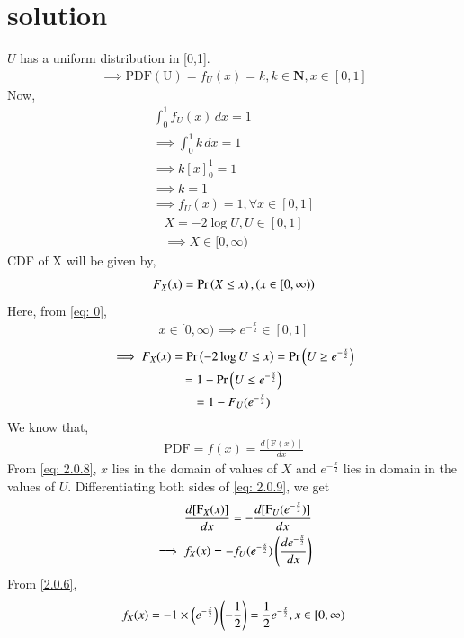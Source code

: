 \documentclass[journal,12pt,twocolumn]{IEEEtran}
\begin{document}
\section{solution}
$U$ has a uniform distribution in [0,1].
\begin{align}
    \implies \mathrm{PDF(U)}=f_U(x)=k, k\in\textbf{N}, x\in[0,1]
\end{align}
Now,
\begin{align}
    \int_{0}^1 f_U(x)\,dx=1\\
    \implies \int_0^1 k\,dx=1\\
    \implies k[x]_0^1=1\\
    \implies k=1\\
    \implies f_U(x)=1, \forall x\in[0,1]\label{2.0.6}
\end{align}
\begin{align}
    X=-2\log{U},U\in[0,1]\\
    \implies X\in[0,\infty)\label{eq: 0}
\end{align}
CDF of X will be given by,
\begin{align}
F_{X}(x) = \Pr\left(X\leq x\right),  \left(x\in[0,\infty)\right)\\
\end{align}
Here, from \eqref{eq: 0},
\begin{align}
x\in[0,\infty)
    \implies e^{-\frac{x}{2}}\in [0,1]\label{eq: 2.0.8}
\end{align}
\begin{multline}
    \implies F_X(x)  =\Pr\left(-2\log U\leq x\right) 
    =\Pr\left(U\geq e^{-\frac{x}{2}}\right)\\
    =1-\Pr\left(U\leq e^{-\frac{x}{2}}\right)\\
    =1-F_{U}(e^{-\frac{x}{2}})\label{eq: 2.0.9}
    \end{multline}
We know that,
\begin{align}
    \mathrm{PDF}=f(x)=\frac{d[\mathrm{F}(x)]}{dx}
\end{align}
From \eqref{eq: 2.0.8}, $x$ lies in the domain of values of $X$ and $e^{-\frac{x}{2}}$ lies in domain in the values of $U$. Differentiating both sides of \eqref{eq: 2.0.9}, we get
\begin{align}
    \frac{d[\mathrm{F}_X(x)]}{dx}=-\frac{d[\mathrm{F}_U(e^{-\frac{x}{2}})]}{dx}\label{eq: 2.0.3}\\
    \implies f_{X}(x)=-f_{U}(e^{-\frac{x}{2}})\left(\frac{de^{-\frac{x}{2}}}{dx}\right)
    \end{align}
  From \eqref{2.0.6},
  \begin{align}
      f_X(x)=-1\times \left(e^{-\frac{x}{2}}\right)\left(-\frac{1}{2}\right)=\frac{1}{2}e^{-\frac{x}{2}},x\in[0,\infty)
  \end{align}
\end{document}
